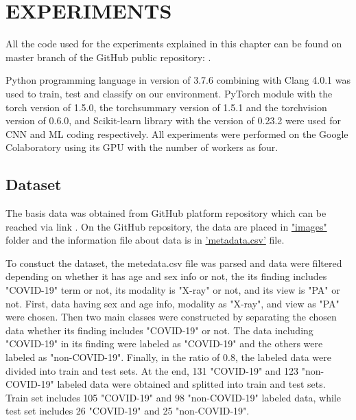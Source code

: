 \chapter{EXPERIMENTS}\label{ch:CH5}

All the code used for the experiments explained in this chapter can be found on master branch of the GitHub public repository: \newline {}. 

Python programming language in version of 3.7.6 combining with Clang 4.0.1 was used to train, test and classify on our environment. PyTorch module with the torch version of 1.5.0, the torchsummary version of 1.5.1 and the torchvision version of 0.6.0, and Scikit-learn library with the version of 0.23.2 were used for CNN and ML coding respectively. All experiments were performed on the Google Colaboratory using its GPU with the number of workers as four.

\section{Dataset}

The basis data was obtained from GitHub platform repository which can be reached via link . On the GitHub repository, the data are placed in \href{https://github.com/ieee8023/covid-chestxray-dataset/tree/master/images}{"images"} folder and the information file about data is in \href{https://github.com/ieee8023/covid-chestxray-dataset/blob/master/metadata.csv}{'metadata.csv'} file.

To constuct the dataset, the metedata.csv file was parsed and data were filtered depending on whether it has age and sex info or not, the its finding includes "COVID-19" term or not, its modality is "X-ray" or not, and its view is "PA" or not. First, data having sex and age info, modality as "X-ray", and view as "PA" were chosen. Then two main classes were constructed by separating the chosen data whether its finding includes "COVID-19" or not. The data including "COVID-19" in its finding were labeled as "COVID-19" and the others were labeled as "non-COVID-19". Finally, in the ratio of 0.8, the labeled data were divided into train and test sets. At the end, 131 "COVID-19" and 123 "non-COVID-19" labeled data were obtained and splitted into train and test sets. Train set includes 105 "COVID-19" and 98 "non-COVID-19" labeled data, while test set includes 26 "COVID-19" and 25 "non-COVID-19".

